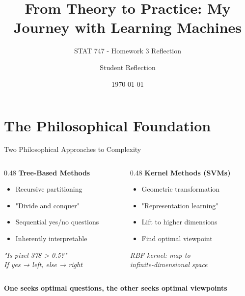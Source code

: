 \documentclass[aspectratio=169]{beamer}
\title{From Theory to Practice: My Journey with Learning Machines}
\subtitle{STAT 747 - Homework 3 Reflection}
\author{Student Reflection}
\date{\today}
\begin{document}
\begin{frame}
\titlepage
\end{frame}


\section{The Philosophical Foundation}

\begin{frame}{Two Philosophical Approaches to Complexity}
\begin{columns}[T]
\begin{column}{0.48\textwidth}
\textbf{Tree-Based Methods}
\begin{itemize}
\item Recursive partitioning
\item "Divide and conquer"
\item Sequential yes/no questions
\item Inherently interpretable
\end{itemize}
\vspace{0.5cm}
\centering
\textit{"Is pixel 378 > 0.5?"}\\
\textit{If yes → left, else → right}
\end{column}

\begin{column}{0.48\textwidth}
\textbf{Kernel Methods (SVMs)}
\begin{itemize}
\item Geometric transformation
\item "Representation learning"
\item Lift to higher dimensions
\item Find optimal viewpoint
\end{itemize}
\vspace{0.5cm}
\centering
\textit{RBF kernel: map to}\\
\textit{infinite-dimensional space}
\end{column}
\end{columns}

\vspace{0.5cm}
\centering
\textbf{One seeks optimal questions, the other seeks optimal viewpoints}
\end{frame}
\end{document}
